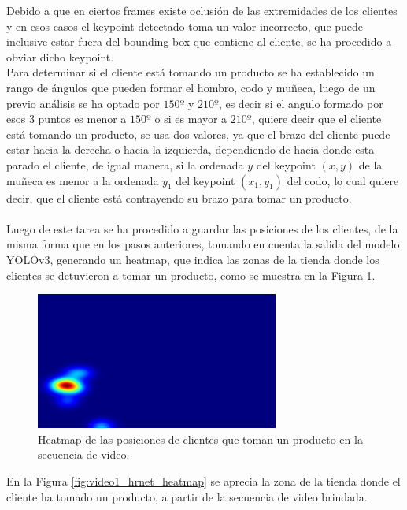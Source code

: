 \documentclass[conference]{IEEEtran}
\begin{document}
\begin{itemize}
Debido a que en ciertos frames existe oclusión de las extremidades de los clientes y en esos casos el keypoint detectado toma un valor incorrecto, que puede inclusive estar fuera del bounding box que contiene al cliente, se ha procedido a obviar dicho keypoint. 
\\
Para determinar si el cliente está tomando un producto se ha establecido un rango de ángulos que pueden formar el hombro, codo y muñeca, luego de un previo análisis se ha optado por $150º$ y $210º$, es decir si el angulo formado por esos 3 puntos es menor a  $150º$ o si es  mayor a $210º$, quiere decir que el cliente está tomando un producto, se usa dos valores, ya que el brazo del cliente puede estar hacia la derecha o hacia la izquierda, dependiendo de hacia donde esta parado el cliente, de igual manera, si la ordenada $y$ del keypoint $(x, y)$ de la muñeca es menor a la ordenada $y_1$ del keypoint $(x_1, y_1)$ del codo, lo cual quiere decir, que el cliente está contrayendo su brazo para tomar un producto.
\\\\
Luego de este tarea se ha procedido a guardar las posiciones de los clientes, de la misma forma que en los pasos anteriores, tomando en cuenta la salida del modelo YOLOv3, generando un heatmap, que indica las zonas de la tienda donde los clientes se detuvieron a tomar un producto, como se muestra en la Figura \ref{fig:video1_hrnet_output_heatmap}.  

\begin{figure}[hbtp]
\centering
\includegraphics[width=8cm]{../Recursos/video1/video1_hrnet_output_heatmap.jpg}
\caption{Heatmap de las posiciones de clientes que toman un producto en la secuencia de video.}
\label{fig:video1_hrnet_output_heatmap}
\end{figure}

En la Figura \ref{fig:video1_hrnet_heatmap} se aprecia la zona de la tienda donde el cliente ha tomado un producto, a partir de la secuencia de video brindada.


\end{itemize}
\end{document}
